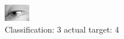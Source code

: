 \begin{figure}[h!]
\begin{center}
\includegraphics[width=0.60\columnwidth]{figures/ID2997_class_3_target_4.png}
\end{center}
\caption{ Classification: 3 actual target: 4}
\label{fig:ID2997_class_3_target_4}
\end{figure}
